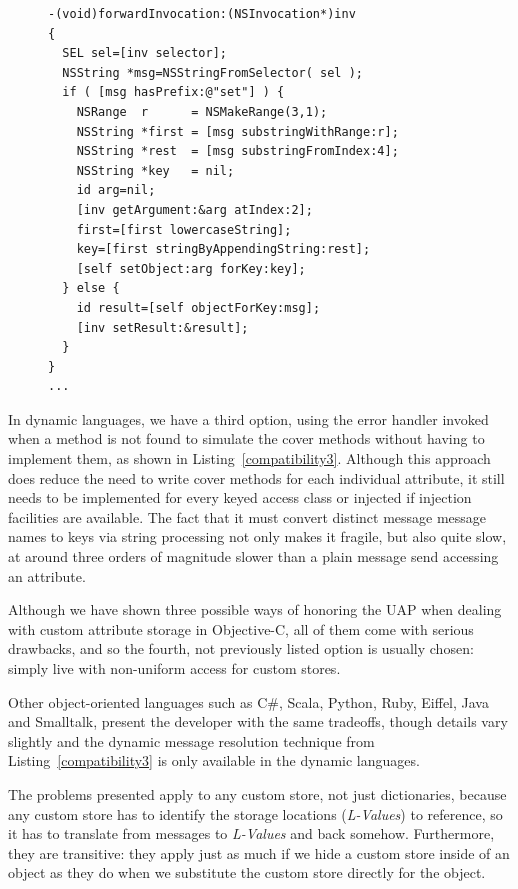 \documentclass[preprint]{sigplanconf}
\begin{document}
\begin{figure}[htbp]
\begin{lstlisting}[style=numbers,label=compatibility3,caption=Compatibility via forwardInvocation.]
-(void)forwardInvocation:(NSInvocation*)inv 
{
  SEL sel=[inv selector];
  NSString *msg=NSStringFromSelector( sel );
  if ( [msg hasPrefix:@"set"] ) {
    NSRange  r      = NSMakeRange(3,1);
    NSString *first = [msg substringWithRange:r];
    NSString *rest  = [msg substringFromIndex:4];
    NSString *key   = nil;
    id arg=nil;
    [inv getArgument:&arg atIndex:2];
    first=[first lowercaseString];
    key=[first stringByAppendingString:rest];
    [self setObject:arg forKey:key];
  } else {
    id result=[self objectForKey:msg];
    [inv setResult:&result];
  }
}
...
\end{lstlisting}
\end{figure}

In dynamic languages, we have a third option, using the error handler invoked when a method
is not found to simulate the cover methods without having to implement them, as shown
in Listing~\ref{compatibility3}.   Although this approach does reduce the need to write
cover methods for each individual attribute, it still needs to be implemented for every keyed
access class or injected if injection facilities are available.  The fact that it must convert
distinct message message names to keys via string processing not only makes it fragile,
but also quite slow, at around three orders of magnitude slower than a plain message
send accessing an attribute.

Although we have shown three possible ways of honoring the UAP when dealing with custom
attribute storage in Objective-C, all of them come with
serious drawbacks, and so the fourth, not previously listed option is usually chosen:  simply
live with non-uniform access for custom stores.

Other object-oriented languages such as C\#, Scala, Python, Ruby, Eiffel, Java and Smalltalk,
present the developer with the same tradeoffs, though details vary slightly and the dynamic
message resolution technique from Listing~\ref{compatibility3} is only available in the dynamic
languages. 

The problems presented apply to any custom store, not just dictionaries,
because any custom store has to identify the storage locations (\emph{L-Values}) to reference,
so it has to translate from messages to \emph{L-Values} and back somehow.  Furthermore,
they are transitive:  they apply just as much if we hide a custom store inside of an object as
they do when we substitute the custom store directly for the object.
\end{document}
